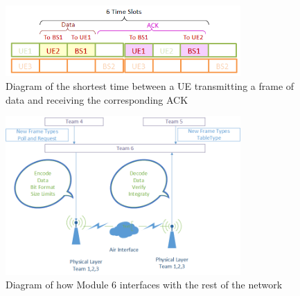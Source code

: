 \begin{figure}[p]
    \centering
    \includegraphics[width=0.8\textwidth]{ACK_timeout_short.PNG}
    \caption{Diagram of the shortest time between a UE transmitting a frame of data and receiving the corresponding ACK}
    \label{fig:ACKtimeshort}
\end{figure}

\begin{figure}[p]
    \centering
    \includegraphics[width=0.8\textwidth]{Interface_diagram.PNG}
    \caption{Diagram of how Module 6 interfaces with the rest of the network}
    \label{fig:Interface}
\end{figure}